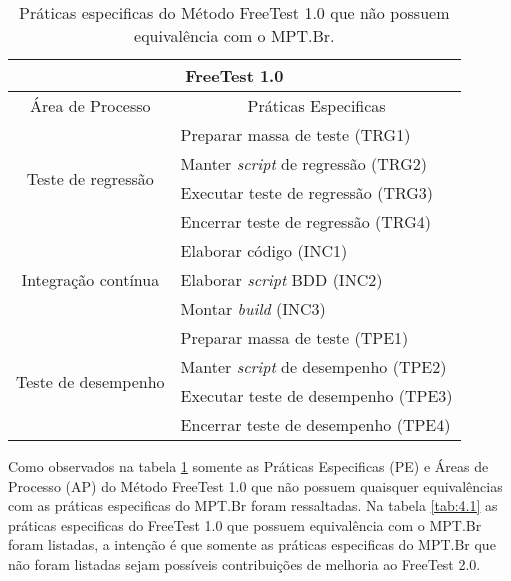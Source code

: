 \begin{table}[!ht]
\centering
\caption{Práticas especificas do Método FreeTest 1.0 que não possuem equivalência com o MPT.Br.}
\label{tab:4.2}
\begin{tabular}{|c|l|}
\hline
\multicolumn{2}{|c|}{\textbf{FreeTest 1.0}}                                     \\ \hline
Área de Processo                     & \multicolumn{1}{c|}{Práticas Especificas} \\ \hline
\multirow{4}{*}{Teste de regressão}  & Preparar massa de teste (TRG1)            \\ \cline{2-2} 
                                     & Manter \textit{script} de regressão (TRG2)         \\ \cline{2-2} 
                                     & Executar teste de regressão (TRG3)        \\ \cline{2-2} 
                                     & Encerrar teste de regressão (TRG4)        \\ \hline
\multirow{3}{*}{Integração contínua} & Elaborar código (INC1)                    \\ \cline{2-2} 
                                     & Elaborar \textit{script} BDD (INC2)                \\ \cline{2-2} 
                                     & Montar \textit{build} (INC3)                       \\ \hline
\multirow{4}{*}{Teste de desempenho} & Preparar massa de teste (TPE1)            \\ \cline{2-2} 
                                     & Manter \textit{script} de desempenho (TPE2)        \\ \cline{2-2} 
                                     & Executar teste de desempenho (TPE3)       \\ \cline{2-2} 
                                     & Encerrar teste de desempenho (TPE4)       \\ \hline
\end{tabular}
\end{table}

Como observados na tabela \ref{tab:4.2} somente as Práticas Especificas (PE) e Áreas de Processo (AP) do Método FreeTest 1.0 que não possuem quaisquer equivalências com as práticas especificas do MPT.Br foram ressaltadas. Na tabela \ref{tab:4.1} as práticas especificas do FreeTest 1.0 que possuem equivalência com o MPT.Br foram listadas, a intenção é que somente as práticas especificas do MPT.Br que não foram listadas sejam possíveis contribuições de melhoria ao FreeTest 2.0.

